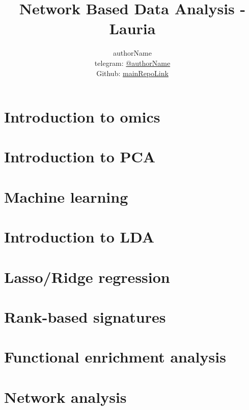 
\title{\Huge\textbf{Network Based Data Analysis - Lauria}}
\author{
  authorName \\
  \small telegram: \href{telegramLink}{@authorName} \\[3pt]
\small Github: \href{mainRepoLink}{mainRepoLink}}



\maketitle
\tableofcontents
  
  

  \part{Introduction to omics}

    
    

  \part{Introduction to PCA}

    

  \part{Machine learning}
    

  \part{Introduction to LDA}

  \part{Lasso/Ridge regression}

  \part{Rank-based signatures}

  \part{Functional enrichment analysis}

  \part{Network analysis}


